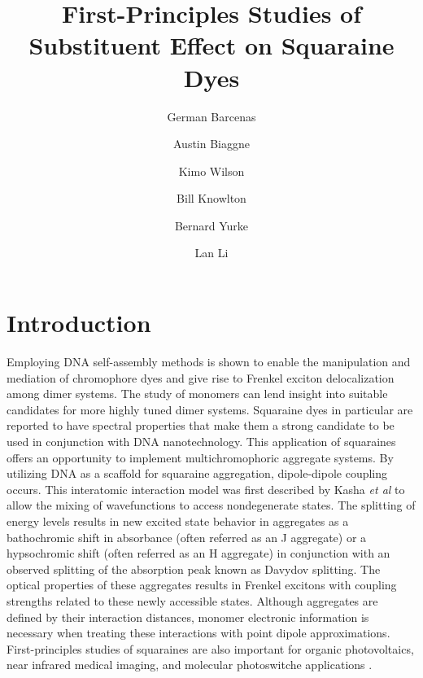 \documentclass[journal=jacsat,manuscript=article]{achemso}
\title{
First-Principles Studies of Substituent Effect on Squaraine Dyes\\
}
\author{German Barcenas}
\affiliation{Boise State University}
\author{Austin Biaggne}
\affiliation{Boise State University}
\author{Kimo Wilson}
\affiliation{Boise State University}
\author{Bill Knowlton}
\affiliation{Boise State University}
\author{Bernard Yurke}
\affiliation{Boise State University}
\author{Lan Li}
\affiliation{Boise State University}
\begin{document}
\maketitle

\section{Introduction}
Employing DNA self-assembly methods is shown to enable the manipulation and mediation of chromophore dyes and give rise to Frenkel exciton delocalization among dimer systems\cite{Cannon2018LargeAggregates}. The study of monomers can lend insight into suitable candidates for more highly tuned dimer systems. Squaraine dyes in particular are reported to have spectral properties that make them a strong candidate to be used in conjunction with DNA nanotechnology\cite{Markova2013ComparisonLabels}⁠. This application of squaraines offers an opportunity to implement multichromophoric aggregate systems. 
By utilizing DNA as a scaffold for squaraine aggregation, dipole-dipole coupling occurs\cite{Cannon2017CoherentSystem}. This interatomic interaction model was first described by Kasha \textit{et al} to allow the mixing of wavefunctions to access  nondegenerate states\cite{Kasha1965TheSpectroscopy}. The splitting of energy levels results in new excited state behavior in aggregates as a bathochromic shift in absorbance (often referred as an J aggregate) or a hypsochromic shift (often referred as an H aggregate)\cite{Wurthner2011J-aggregates:Materials} in conjunction with an observed splitting of the absorption peak known as Davydov splitting\cite{Zhong2019DavydovDimers}. The optical properties of these aggregates results in Frenkel excitons with coupling strengths related to these newly accessible states. 
Although aggregates are defined by their interaction distances, monomer electronic information is necessary when treating these interactions with point dipole approximations\cite{Abramavicius2009ExtractingSpectra}. First-principles  studies of squaraines are also important for organic photovoltaics\citep{Wei2012FunctionalizedPhotovoltaics, Chen2018DensityCell}, near infrared medical imaging\cite{Strassel2018SquaraineNm}⁠, and molecular photoswitche applications\citep{Kellis2019AnPhases, Scholes2011LessonsHarvesting} .
\end{document}
